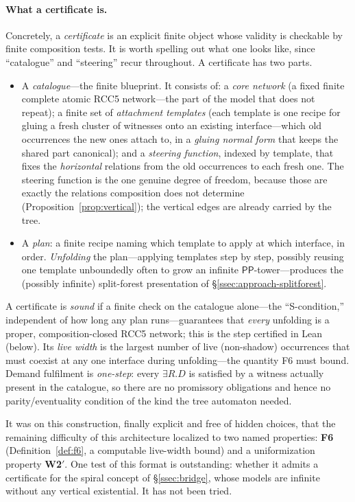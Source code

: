 \documentclass[11pt]{article}
\newcommand{\PP}{\mathsf{PP}}
\theoremstyle{plain}
\theoremstyle{definition}
\begin{document}
\paragraph{What a certificate is.} Concretely, a \emph{certificate} is an
explicit finite object whose validity is checkable by finite composition
tests. It is worth spelling out what one looks like, since ``catalogue'' and
``steering'' recur throughout. A certificate has two parts.
\begin{itemize}
  \item A \emph{catalogue}---the finite blueprint. It consists of: a
    \emph{core network} (a fixed finite complete atomic RCC5 network---the
    part of the model that does not repeat); a finite set of
    \emph{attachment templates} (each template is one recipe for gluing a
    fresh cluster of witnesses onto an existing interface---which old
    occurrences the new ones attach to, in a \emph{gluing normal form} that
    keeps the shared part canonical); and a \emph{steering function},
    indexed by template, that fixes the \emph{horizontal} relations from the
    old occurrences to each fresh one. The steering function is the one
    genuine degree of freedom, because those are exactly the relations
    composition does not determine (Proposition~\ref{prop:vertical}); the
    vertical edges are already carried by the tree.
  \item A \emph{plan}: a finite recipe naming which template to apply at
    which interface, in order. \emph{Unfolding} the plan---applying
    templates step by step, possibly reusing one template unboundedly often
    to grow an infinite $\PP$-tower---produces the (possibly infinite)
    split-forest presentation of \S\ref{ssec:approach-splitforest}.
\end{itemize}
A certificate is \emph{sound} if a finite check on the catalogue alone---the
``S-condition,'' independent of how long any plan runs---guarantees that
\emph{every} unfolding is a proper, composition-closed RCC5 network; this is
the step certified in Lean (below). Its \emph{live width} is the largest
number of live (non-shadow) occurrences that must coexist at any one
interface during unfolding---the quantity F6 must bound. Demand fulfilment
is \emph{one-step}: every $\exists R.D$ is satisfied by a witness actually
present in the catalogue, so there are no promissory obligations and hence
no parity/eventuality condition of the kind the tree automaton needed.

It was on this construction, finally explicit and free of hidden choices,
that the remaining difficulty of this architecture localized to two named properties:
\textbf{F6} (Definition~\ref{def:f6}, a computable live-width bound) and a
uniformization property \textbf{W2$'$}. One test of this format is
outstanding: whether it admits a certificate for the spiral concept of
\S\ref{ssec:bridge}, whose models are infinite without any vertical
existential. It has not been tried.
\end{document}
